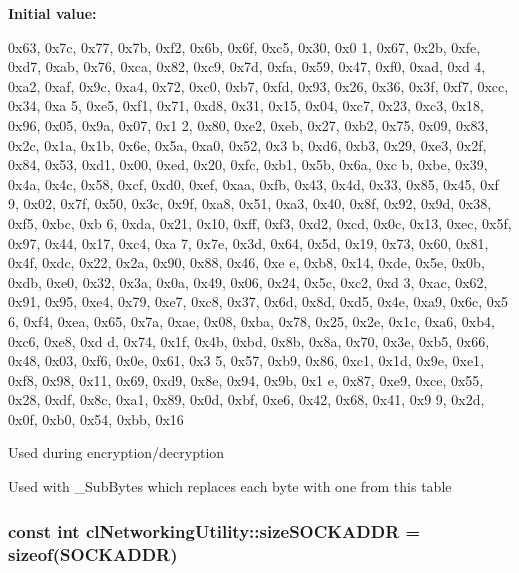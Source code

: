\label{classcl_networking_utility_af84431055c223f65227359514898c157}
{\bfseries Initial value:}
\begin{DoxyCode}

        {
                        0x63, 0x7c, 0x77, 0x7b, 0xf2, 0x6b, 0x6f, 0xc5, 0x30, 0x0
      1, 0x67, 0x2b, 0xfe, 0xd7, 0xab, 0x76,
                        0xca, 0x82, 0xc9, 0x7d, 0xfa, 0x59, 0x47, 0xf0, 0xad, 0xd
      4, 0xa2, 0xaf, 0x9c, 0xa4, 0x72, 0xc0,
                        0xb7, 0xfd, 0x93, 0x26, 0x36, 0x3f, 0xf7, 0xcc, 0x34, 0xa
      5, 0xe5, 0xf1, 0x71, 0xd8, 0x31, 0x15,
                        0x04, 0xc7, 0x23, 0xc3, 0x18, 0x96, 0x05, 0x9a, 0x07, 0x1
      2, 0x80, 0xe2, 0xeb, 0x27, 0xb2, 0x75,
                        0x09, 0x83, 0x2c, 0x1a, 0x1b, 0x6e, 0x5a, 0xa0, 0x52, 0x3
      b, 0xd6, 0xb3, 0x29, 0xe3, 0x2f, 0x84,
                        0x53, 0xd1, 0x00, 0xed, 0x20, 0xfc, 0xb1, 0x5b, 0x6a, 0xc
      b, 0xbe, 0x39, 0x4a, 0x4c, 0x58, 0xcf,
                        0xd0, 0xef, 0xaa, 0xfb, 0x43, 0x4d, 0x33, 0x85, 0x45, 0xf
      9, 0x02, 0x7f, 0x50, 0x3c, 0x9f, 0xa8,
                        0x51, 0xa3, 0x40, 0x8f, 0x92, 0x9d, 0x38, 0xf5, 0xbc, 0xb
      6, 0xda, 0x21, 0x10, 0xff, 0xf3, 0xd2,
                        0xcd, 0x0c, 0x13, 0xec, 0x5f, 0x97, 0x44, 0x17, 0xc4, 0xa
      7, 0x7e, 0x3d, 0x64, 0x5d, 0x19, 0x73,
                        0x60, 0x81, 0x4f, 0xdc, 0x22, 0x2a, 0x90, 0x88, 0x46, 0xe
      e, 0xb8, 0x14, 0xde, 0x5e, 0x0b, 0xdb,
                        0xe0, 0x32, 0x3a, 0x0a, 0x49, 0x06, 0x24, 0x5c, 0xc2, 0xd
      3, 0xac, 0x62, 0x91, 0x95, 0xe4, 0x79,
                        0xe7, 0xc8, 0x37, 0x6d, 0x8d, 0xd5, 0x4e, 0xa9, 0x6c, 0x5
      6, 0xf4, 0xea, 0x65, 0x7a, 0xae, 0x08,
                        0xba, 0x78, 0x25, 0x2e, 0x1c, 0xa6, 0xb4, 0xc6, 0xe8, 0xd
      d, 0x74, 0x1f, 0x4b, 0xbd, 0x8b, 0x8a,
                        0x70, 0x3e, 0xb5, 0x66, 0x48, 0x03, 0xf6, 0x0e, 0x61, 0x3
      5, 0x57, 0xb9, 0x86, 0xc1, 0x1d, 0x9e,
                        0xe1, 0xf8, 0x98, 0x11, 0x69, 0xd9, 0x8e, 0x94, 0x9b, 0x1
      e, 0x87, 0xe9, 0xce, 0x55, 0x28, 0xdf,
                        0x8c, 0xa1, 0x89, 0x0d, 0xbf, 0xe6, 0x42, 0x68, 0x41, 0x9
      9, 0x2d, 0x0f, 0xb0, 0x54, 0xbb, 0x16
        }
\end{DoxyCode}
Used during encryption/decryption \par
 Used with \_\-SubBytes which replaces each byte with one from this table \hypertarget{classcl_networking_utility_a770140d003b41cb571e83988a96c9c50}{
\subsubsection[{sizeSOCKADDR}]{\setlength{\rightskip}{0pt plus 5cm}const int {\bf clNetworkingUtility::sizeSOCKADDR} = sizeof(SOCKADDR)}}
